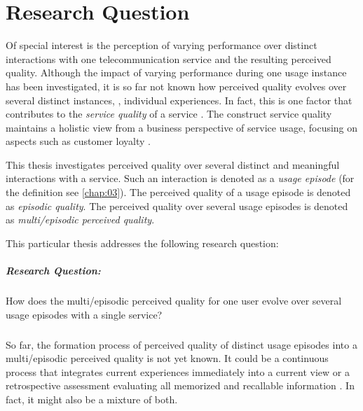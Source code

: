 \section{Research Question}
Of special interest is the perception of varying performance over distinct interactions with one telecommunication service and the resulting perceived quality.
Although the impact of varying performance during one usage instance has been investigated, it is so far not known how perceived quality evolves over several distinct instances, \ie, individual experiences.
In fact, this is one factor that contributes to the \emph{service quality} of a service \citep[][]{berry_quality_1985, zeithaml_behavioral_1996}.
The construct service quality maintains a holistic view from a business perspective of service usage, focusing on aspects such as customer loyalty \citep{parasuraman_conceptual_1985}.

This thesis investigates perceived quality over several distinct and meaningful interactions with a service.
Such an interaction is denoted as a \emph{usage episode} (for the definition see \autoref{chap:03}).
The perceived quality of a usage episode is denoted as \emph{episodic quality}.
The perceived quality over several usage episodes is denoted as \emph{multi\-/episodic perceived quality}.

This particular thesis addresses the following research question: 
\subparagraph*{Research Question:}
How does the multi\-/episodic perceived quality for one user evolve over several usage episodes with a single service?

\subparagraph*{}
So far, the formation process of perceived quality of distinct usage episodes into a multi\-/episodic perceived quality is not yet known.
It could be a continuous process that integrates current experiences immediately into a current view or a retrospective assessment evaluating all memorized and recallable information \citep[][]{hogarth_order_1992}. 
In fact, it might also be a mixture of both.


